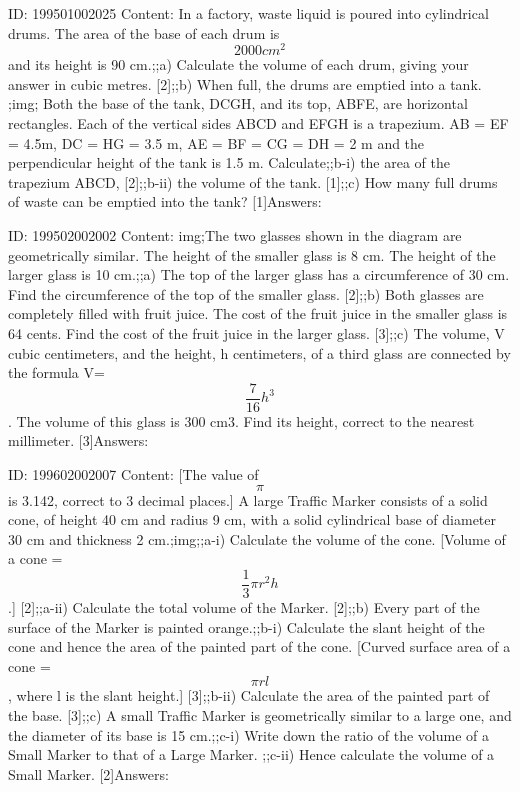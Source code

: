 \documentclass{article}
\begin{document}
ID: 199501002025
Content:
In a factory, waste liquid is poured into cylindrical drums. The area of the base of each drum is $$2000 cm^2$$ and its height is 90 cm.;;a) Calculate the volume of each drum, giving your answer in cubic metres. [2];;b) When full, the drums are emptied into a tank. ;img; Both the base of the tank, DCGH, and its top, ABFE, are horizontal rectangles. Each of the vertical sides ABCD and EFGH is a trapezium. AB = EF = 4.5m, DC = HG = 3.5 m, AE = BF = CG = DH = 2 m and the perpendicular height of the tank is 1.5 m. Calculate;;b-i) the area of the trapezium ABCD, [2];;b-ii) the volume of the tank. [1];;c) How many full drums of waste can be emptied into the tank? [1]Answers:

ID: 199502002002
Content:
img;The two glasses shown in the diagram are geometrically similar. The height of the smaller glass is 8 cm. The height of the larger glass is 10 cm.;;a) The top of the larger glass has a circumference of 30 cm. Find the circumference of the top of the smaller glass. [2];;b) Both glasses are completely filled with fruit juice. The cost of the fruit juice in the smaller glass is 64 cents. Find the cost of the fruit juice in the larger glass. [3];;c) The volume, V cubic centimeters, and the height, h centimeters, of a third glass are connected by the formula  V= $$\frac{7}{16}h^3$$. The volume of this glass is 300 cm3. Find its height, correct to the nearest millimeter. [3]Answers:

ID: 199602002007
Content:
[The value of $$\pi$$ is 3.142, correct to 3 decimal places.] A large Traffic Marker consists of a solid cone, of height 40 cm and radius 9 cm, with a solid cylindrical base of diameter 30 cm and thickness 2 cm.;img;;a-i) Calculate the volume of the cone. [Volume of a cone = $$\frac{1}{3} \pi r^2h$$.] [2];;a-ii) Calculate the total volume of the Marker. [2];;b) Every part of the surface of the Marker is painted orange.;;b-i) Calculate the slant height of the cone and hence the area of the painted part of the cone. [Curved surface area of a cone = $$\pi r l$$, where l is the slant height.] [3];;b-ii) Calculate the area of the painted part of the base. [3];;c) A small Traffic Marker is geometrically similar to a large one, and the diameter of its base is 15 cm.;;c-i) Write down the ratio of the volume of a Small Marker to that of a Large Marker. ;;c-ii) Hence calculate the volume of a Small Marker. [2]Answers:
\end{document}
